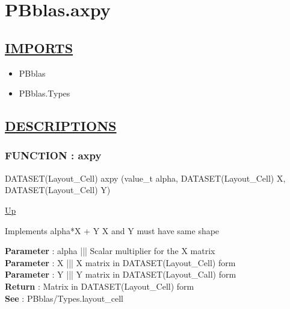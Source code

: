 \chapter*{PBblas.axpy}
\hypertarget{ecldoc:toc:PBblas.axpy}{}

\section*{\underline{IMPORTS}}
\begin{itemize}
\item PBblas
\item PBblas.Types
\end{itemize}

\section*{\underline{DESCRIPTIONS}}
\subsection*{FUNCTION : axpy}
\hypertarget{ecldoc:pbblas.axpy}{}
\begin{minipage}[t]{\textwidth}
\begin{flushleft}
DATASET(Layout\_Cell) axpy (value\_t alpha, DATASET(Layout\_Cell) X, DATASET(Layout\_Cell) Y)
\end{flushleft}
\end{minipage}
\hyperlink{ecldoc:toc:PBblas}{Up}

\par
Implements alpha*X + Y X and Y must have same shape
\par
\textbf{Parameter} : alpha ||| Scalar multiplier for the X matrix \\
\textbf{Parameter} : X ||| X matrix in DATASET(Layout\_Cell) form \\
\textbf{Parameter} : Y ||| Y matrix in DATASET(Layout\_Call) form \\
\textbf{Return} : Matrix in DATASET(Layout\_Cell) form \\
\textbf{See} : PBblas/Types.layout\_cell \\
